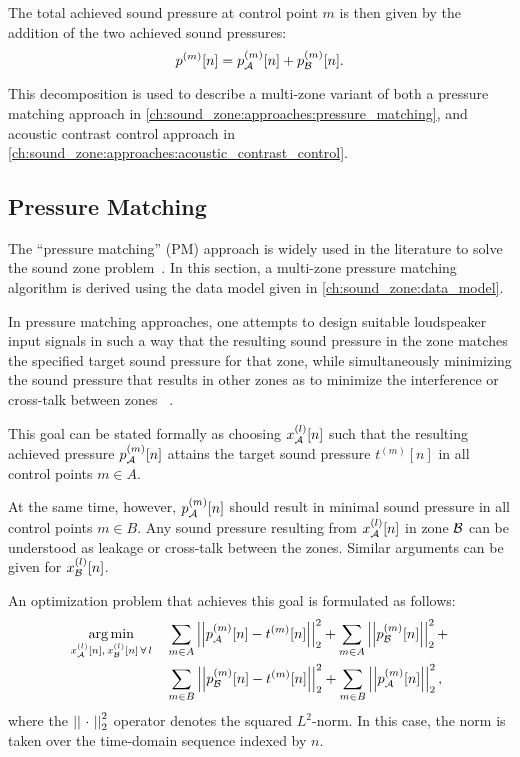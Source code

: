 The total achieved sound pressure at control point $m$ is then given by the addition of the two achieved sound pressures:
\begin{equation}
    p^{(m)}[n] = p_{\mathcal{A}}^{(m)}[n] + p_{\mathcal{B}}^{(m)}[n].
\end{equation}

This decomposition is used to describe a multi-zone variant of both a pressure matching approach 
in \autoref{ch:sound_zone:approaches:pressure_matching},
and acoustic contrast control approach in \autoref{ch:sound_zone:approaches:acoustic_contrast_control}.

\subsection{Pressure Matching}
\label{ch:sound_zone:approaches:pressure_matching}
The ``pressure matching'' (PM) approach is widely used in the literature to 
solve the sound zone problem~\cite{betlehem2015personal, moller2016sound}.
In this section, a multi-zone pressure matching algorithm is derived using the data model 
given in \autoref{ch:sound_zone:data_model}.

In pressure matching approaches, one attempts to design suitable loudspeaker input 
signals in such a way that the resulting sound pressure in the zone 
matches the specified target sound pressure for that zone, 
while simultaneously minimizing the sound pressure that results in other zones as 
to minimize the interference or cross-talk between zones
~\cite{betlehem2015personal, olik2013comparative}.

This goal can be stated formally as choosing $x_{\mathcal{A}}^{(l)}[n]$ such that the resulting achieved pressure 
$p_{\mathcal{A}}^{(m)}[n]$ attains the target sound pressure $t^{(m)}[n]$ in all control points $m \in A$.   

At the same time, however, $p_{\mathcal{A}}^{(m)}[n]$ should result in minimal sound pressure in all control points $m \in B$.
Any sound pressure resulting from $x_{\mathcal{A}}^{(l)}[n]$ in zone $\mathcal{B}$ can be understood as leakage or cross-talk between the zones. 
Similar arguments can be given for $x_{\mathcal{B}}^{(l)}[n]$.

An optimization problem that achieves this goal is formulated as follows:
\begin{align}
    \begin{aligned}
        \argmin{x_\za^{(l)}[n],\,x_\zb^{(l)}[n]\,\forall\,l}{
           &\sum_{m\in A} \norm[2][2]{p_\za^{(m)}[n] - t^{(m)}[n]} +
            \sum_{m\in A} \norm[2][2]{p_\zb^{(m)}[n]} + \\
           &\sum_{m\in B} \norm[2][2]{p_\zb^{(m)}[n] - t^{(m)}[n]} + 
            \sum_{m\in B} \norm[2][2]{p_\za^{(m)}[n]}
        },
    \end{aligned}
\end{align}
where the $\norm[2][2]{\,\,\cdot\,\,}$ operator denotes the squared $L^2$-norm.
In this case, the norm is taken over the time-domain sequence indexed by $n$.

